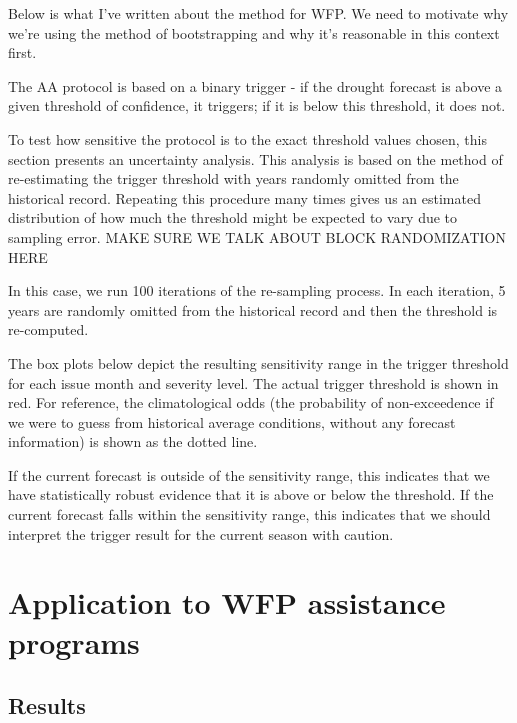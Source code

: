 \documentclass{ametsocV5}
\begin{document}


Below is what I've written about the method for WFP. We need to motivate why we're using the method of bootstrapping and why it's reasonable in this context first.

The AA protocol is based on a binary trigger - if the drought forecast is above a given threshold of confidence, it triggers; if it is below this threshold, it does not.

To test how sensitive the protocol is to the exact threshold values chosen, this section presents an uncertainty analysis. This analysis is based on the method of re-estimating the trigger threshold with years randomly omitted from the historical record. Repeating this procedure many times gives us an estimated distribution of how much the threshold might be expected to vary due to sampling error. MAKE SURE WE TALK ABOUT BLOCK RANDOMIZATION HERE

In this case, we run 100 iterations of the re-sampling process. In each iteration, 5 years are randomly omitted from the historical record and then the threshold is re-computed.

The box plots below depict the resulting sensitivity range in the trigger threshold for each issue month and severity level. The actual trigger threshold is shown in red. For reference, the climatological odds (the probability of non-exceedence if we were to guess from historical average conditions, without any forecast information) is shown as the dotted line.

If the current forecast is outside of the sensitivity range, this indicates that we have statistically robust evidence that it is above or below the threshold. If the current forecast falls within the sensitivity range, this indicates that we should interpret the trigger result for the current season with caution.


\section{Application to WFP assistance programs}

\subsection{Results}

\end{document}
